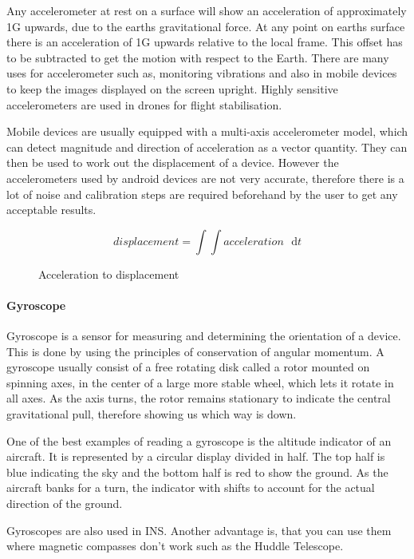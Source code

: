Any accelerometer at rest on a surface will show an acceleration of
approximately 1G upwards\cite{accl-wiki}, due to the earths gravitational force. At
any point on earths surface there is an acceleration of 1G upwards
relative to the local frame. This offset has to be subtracted to get
the motion with respect to the Earth. There are many uses for accelerometer such as,
monitoring vibrations and also in mobile devices to
keep the images displayed on the screen upright. Highly sensitive
accelerometers are used in drones for flight stabilisation.

Mobile devices are usually equipped with a multi-axis accelerometer model,
which can detect magnitude and direction of acceleration as a
vector quantity. They can then be used to work out the displacement
of a device. However the accelerometers used by android devices
are not very accurate, therefore there is a lot of noise and calibration
steps are required beforehand by the user to get any acceptable results.

\begin{figure}[H]
\[
displacement =\int\int acceleration\mathrm{\text{ }d}t
\]
 

\protect\caption{Acceleration to displacement}
\label{double_integration}


\end{figure}



\paragraph{Gyroscope}

Gyroscope\cite{innertial_nav_sys} is a sensor for measuring and determining the orientation
of a device. This is done by using the principles of conservation
of angular momentum. A gyroscope usually consist of a free rotating
disk called a rotor mounted on spinning axes, in the center of a large
more stable wheel, which lets it rotate in all axes. As the axis
turns, the rotor remains stationary to indicate the central gravitational
pull, therefore showing us which way is down.

One of the best examples of reading a gyroscope is the altitude indicator
of an aircraft. It is represented by a circular display divided in
half. The top half is blue indicating the sky and the bottom half
is red to show the ground. As the aircraft banks for a turn, the indicator
with shifts to account for the actual direction of the ground.

Gyroscopes are also used in INS. Another advantage is, that
you can use them where magnetic compasses don't work such as the Huddle
Telescope\cite{gyroscope-wiki}.


